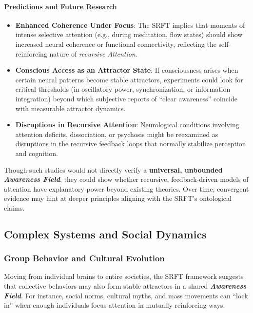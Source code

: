 \documentclass[12pt,a4paper]{article}
\begin{document}
\paragraph{Predictions and Future Research}
\begin{itemize}
    \item \textbf{Enhanced Coherence Under Focus}: The SRFT implies that moments of intense selective attention (e.g., during meditation, flow states) should show increased neural coherence or functional connectivity, reflecting the self-reinforcing nature of \emph{recursive Attention}.
    \item \textbf{Conscious Access as an Attractor State}: If consciousness arises when certain neural patterns become stable attractors, experiments could look for critical thresholds (in oscillatory power, synchronization, or information integration) beyond which subjective reports of “clear awareness” coincide with measurable attractor dynamics.
    \item \textbf{Disruptions in Recursive Attention}: Neurological conditions involving attention deficits, dissociation, or psychosis might be reexamined as disruptions in the recursive feedback loops that normally stabilize perception and cognition.
\end{itemize}
Though such studies would not directly verify a \textbf{universal, unbounded \emph{Awareness Field}}, they could show whether recursive, feedback-driven models of attention have explanatory power beyond existing theories. Over time, convergent evidence may hint at deeper principles aligning with the SRFT’s ontological claims.

\subsection{Complex Systems and Social Dynamics}
\label{subsec:complex-systems-social}

\subsubsection{Group Behavior and Cultural Evolution}
Moving from individual brains to entire societies, the SRFT framework suggests that collective behaviors may also form stable attractors in a shared \textbf{\emph{Awareness Field}}. For instance, social norms, cultural myths, and mass movements can “lock in” when enough individuals focus attention in mutually reinforcing ways.
\end{document}
